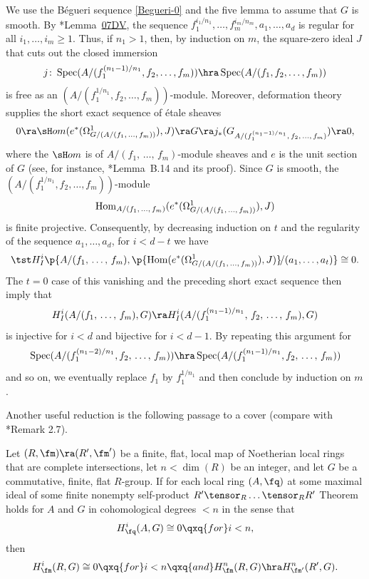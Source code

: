 \bpf
We use the B\'{e}gueri sequence \eqref{Begueri-0} and the five lemma to assume that $G$ is smooth.
By \cite{SP}*{Lemma~\href{https://stacks.math.columbia.edu/tag/07DV}{07DV}}, the sequence $f_1^{i_1/n_1}, \dotsc, f_m^{i_m/n_m}, a_1, \dotsc, a_d$ is regular for all $i_1, \dotsc, i_m \ge 1$. Thus, if $n_1 > 1$, then, by induction on $m$,  the square-zero ideal $J$ that cuts out the closed immersion
\[
j \colon \Spec(A/(f_1^{(n_1 - 1)/n_1}, f_2, \dotsc, f_m)) \hra \Spec(A/(f_1, f_2, \dotsc, f_m))
\]
is free as an $(A/(f^{1/n_1}_1, f_2, \dotsc, f_m))$-module.
 Moreover, deformation theory supplies the short exact sequence of \'{e}tale sheaves%
\[%
\source{purity-flat-cohomology}
0 \ra \sH om (e^*(\Omega^1_{G/(A/(f_1,\, \dotsc,\, f_m))}), J) \ra G \ra j_*(G_{A/(f^{(n_1 - 1)/n_1}_1,\, f_2,\, \dotsc,\, f_m)}) \ra 0,
\]%
where the $\sH om$ is of $A/(f_1,\, \dotsc,\, f_m )$-module sheaves and $e$ is the unit section of $G$ (see, for instance, \cite{topology-torsors}*{Lemma~B.14 and its proof}). Since $G$ is smooth, the $(A/(f^{1/n_1}_1,  f_2, \dotsc, f_m))$-module
\[
\operatorname{Hom}_{A/(f_1,\, \dotsc,\, f_m )} (e^*(\Omega^1_{G/(A/(f_1,\, \dotsc,\, f_m))}), J)
\]
is finite projective. Consequently, by decreasing induction on $t$ and the regularity of the sequence $a_1, \dotsc, a_d$, for $i < d - t$ we have
\[
\tst H^i_I\p{A/(f_1,\, \dotsc,\, f_m ), \p{\Hom (e^*(\Omega^1_{G/(A/(f_1,\, \dotsc,\, f_m))}), J)}\!/(a_1, \dotsc, a_t)} \cong 0.
\]
The $t = 0$ case of this vanishing and the preceding short exact sequence then imply that
\[
H^i_I(A/(f_1,\, \dotsc,\, f_m ), G) \ra H^i_I(A/(f^{(n_1 - 1)/n_1}_1,\, f_2,\, \dotsc,\, f_m ), G)
\]
is injective for $i < d$ and bijective for $i < d - 1$. By repeating this argument for
\[
\Spec(A/(f^{(n_1 - 2)/n_1}_1, f_2,\, \dotsc,\, f_m)) \hra \Spec(A/(f^{(n_1 - 1)/n_1}_1, f_2,\, \dotsc,\, f_m ))
\]
and so on, we eventually replace $f_1$ by $f_1^{1/n_1}$ and then conclude by induction on $m$.
\epf



Another useful reduction is the following passage to a cover (compare with \cite{brauer-purity}*{Remark 2.7}). %

\blem {}
Let $(R, \fm) \ra (R', \fm')$ be a finite, flat, local map of Noetherian local rings that are %
complete intersections, let $n < \dim(R)$ be an integer, and let $G$ be a commutative, finite, flat $R$-group. If for each local ring $(A, \fq)$ at some maximal ideal of some finite nonempty self-product $R' \tensor_R \dotsc \tensor_R R'$ Theorem~ holds for $A$ and $G$ in cohomological degrees $< n$ in the sense that
\[
H^i_\fq(A, G) \cong 0 \qxq{for} i < n,
\]
then
\[
H^i_\fm(R, G) \cong 0 \qxq{for} i < n \qxq{and} H^n_\fm(R, G) \hra H^n_{\fm'}(R', G).
\]
\elem

